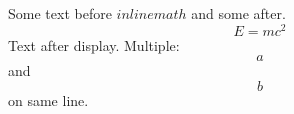 Some text before $inline math$ and some after.
\[E = mc^2\]
Text after display.
Multiple: \[a\] and \[b\] on same line.
